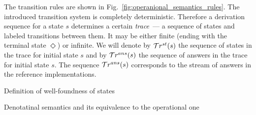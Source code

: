 The transition rules are shown in Fig.~\ref{fig:operanional_semantics_rules}.
The introduced transition system is completely deterministic.
Therefore a derivation sequence for a state $s$ determines a certain \emph{trace}~--- a sequence of states and labeled transitions between
them.
It may be either finite (ending with the terminal state $\Diamond$) or infinite.
We will denote by $\mathcal{T}r^{st}(s)$ the sequence of states in the trace for initial state $s$ and by $\mathcal{T}r^{ans}(s)$ the sequence of answers
in the trace for initial state $s$. The sequence $\mathcal{T}r^{ans}(s)$ corresponds to the stream of answers in the reference \mK implementations.

\colorbox{red!20}{\parbox{\textwidth}{Definition of well-foundness of states}}

\colorbox{red!20}{\parbox{\textwidth}{Denotatinal semantics and its equivalence to the operational one}}
